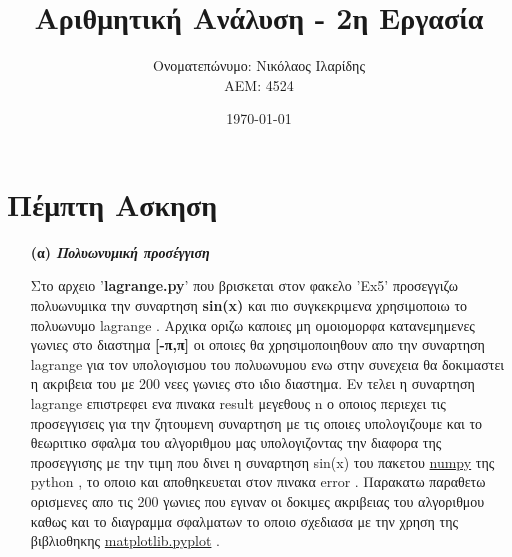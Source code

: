 \documentclass[a4paper,11pt]{article}
\title{Αριθμητική Ανάλυση - 2η Εργασία}
\author{Ονοματεπώνυμο: Νικόλαος Ιλαρίδης \\ ΑΕΜ: 4524}
\date{\today}
\begin{document}
	\maketitle
	
	\section{Πέμπτη Ασκηση}
	\begin{enumerate}
		\item[\textbf{(α)}] \emph {\textbf{Πολυωνυμική προσέγγιση}}
		\vspace{2cm}
		\begin{center}
			Στο αρχειο '\textbf{lagrange.py}' που βρισκεται στον φακελο 'Ex5' προσεγγιζω πολυωνυμικα την συναρτηση \textbf{sin(x)} και πιο συγκεκριμενα χρησιμοποιω το πολυωνυμο lagrange . Αρχικα οριζω καποιες μη ομοιομορφα κατανεμημενες γωνιες στο διαστημα \textbf{[-π,π]} οι οποιες θα χρησιμοποιηθουν απο την συναρτηση lagrange για τον υπολογισμου του πολυωνυμου ενω στην συνεχεια θα δοκιμαστει η ακριβεια του με 200 νεες γωνιες στο ιδιο διαστημα. Εν τελει η συναρτηση lagrange επιστρεφει ενα πινακα result μεγεθους n ο οποιος περιεχει τις προσεγγισεις για την ζητουμενη συναρτηση με τις οποιες υπολογιζουμε και το θεωριτικο σφαλμα του αλγοριθμου μας υπολογιζοντας την διαφορα της προσεγγισης με την τιμη που δινει η συναρτηση sin(x) του πακετου \underline{numpy} της python , το οποιο και αποθηκευεται στον πινακα error . Παρακατω παραθετω ορισμενες απο τις 200 γωνιες που εγιναν οι δοκιμες ακριβειας του αλγοριθμου καθως και το διαγραμμα σφαλματων το οποιο σχεδιασα με την χρηση της βιβλιοθηκης  \underline{matplotlib.pyplot} .
		\end{center}


\end{enumerate}
\end{document}
